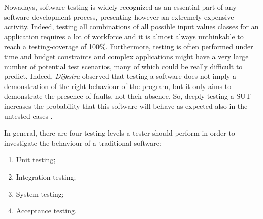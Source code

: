 Nowadays, software testing is widely recognized as an essential part of any software development process, presenting however an extremely expensive activity. Indeed, testing all combinations of all possible input values classes for an application \cite{glinz} requires a lot of workforce and it is almost always unthinkable to reach a testing-coverage of 100\%. 
Furthermore, testing is often performed under time and budget constraints \cite{grano} and complex applications might have a very large number of potential test scenarios, many of which could be really difficult to predict. Indeed, \textit{Dijkstra} \cite{dijkstra} observed that testing a software does not imply a demonstration of the right behaviour of the program, but it only aims to demonstrate the presence of faults, not their absence. 
So, deeply testing a SUT increases the probability that this software will behave as expected also in the untested cases \cite{glinz}. 

In general, there are four testing levels a tester should perform in order to investigate the behaviour of a traditional software: 
\begin{enumerate}
\item Unit testing; 
\item Integration testing; 
\item System testing; 
\item Acceptance testing.
\end{enumerate}

